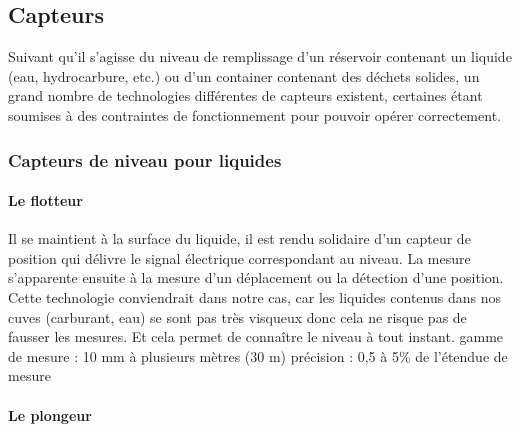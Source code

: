 
 

\subsection{Capteurs}

Suivant qu’il s’agisse du niveau de remplissage d’un réservoir contenant un liquide (eau, hydrocarbure, etc.) ou d’un container contenant des déchets solides, un grand nombre de technologies différentes de capteurs existent, certaines étant soumises à des contraintes de fonctionnement pour pouvoir opérer correctement.

\subsubsection{Capteurs de niveau pour liquides}

\paragraph{Le flotteur}

Il se maintient à la surface du liquide, il est rendu solidaire d'un capteur de position qui délivre le signal électrique correspondant au niveau. La mesure s'apparente ensuite à la mesure d'un déplacement ou la détection d'une position.
Cette technologie conviendrait dans notre cas, car les liquides contenus dans nos cuves (carburant, eau) se sont pas très visqueux donc cela ne risque pas de fausser les mesures. Et cela permet de connaître le niveau à tout instant.
gamme de mesure : 10 mm à plusieurs mètres (30 m)
précision : 0,5 à 5\% de l'étendue de mesure

\paragraph{Le plongeur}

